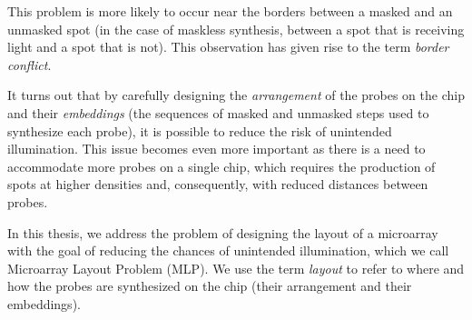 This problem is more likely to occur near the borders between a masked and
an unmasked spot (in the case of maskless synthesis, between a spot that
is receiving light and a spot that is not). This observation has given rise to
the term \emph{border conflict}.

It turns out that by carefully designing the \emph{arrangement} of the probes
on the chip and their \emph{embeddings} (the sequences of masked and unmasked
steps used to synthesize each probe), it is possible to reduce the risk of
unintended illumination. This issue becomes even more important as there is a
need to accommodate more probes on a single chip, which requires the
production of spots at higher densities and, consequently, with reduced
distances between probes.

In this thesis, we address the problem of designing the layout of a
microarray with the goal of reducing the chances of unintended illumination,
which we call Microarray Layout Problem (MLP). We use the term \emph{layout}
to refer to where and how the probes are synthesized on the chip (their
arrangement and their embeddings).
